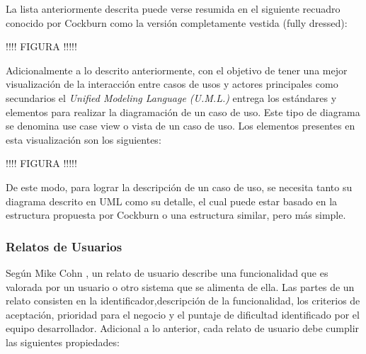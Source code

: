 La lista anteriormente descrita puede verse resumida en el siguiente recuadro conocido por Cockburn como la versión completamente vestida (fully dressed):

!!!! FIGURA !!!!!

Adicionalmente a lo descrito anteriormente, con el objetivo de tener una mejor visualización de la interacción entre casos de usos y actores principales como secundarios el \textit{Unified Modeling Language (U.M.L.)} \cite{uml} entrega los estándares y elementos para realizar la diagramación de un caso de uso. Este tipo de diagrama se denomina use case view o vista de un caso de uso. Los elementos presentes en esta visualización son los siguientes:

!!!! FIGURA !!!!!

De este modo, para lograr la descripción de un caso de uso, se necesita tanto su diagrama descrito en UML como su detalle, el cual puede estar basado en la estructura propuesta por Cockburn o una estructura similar, pero más simple.

\subsubsection{Relatos de Usuarios \label{sec:user_stories}}

Según Mike Cohn \cite{user_stories_applied}, un relato de usuario describe una funcionalidad que es valorada por un usuario o otro sistema que se alimenta de ella.  Las partes de un relato consisten en la identificador,descripción de la funcionalidad, los criterios de aceptación, prioridad para el negocio y el puntaje de dificultad identificado por el equipo desarrollador. Adicional a lo anterior, cada relato de usuario debe cumplir las siguientes propiedades:

